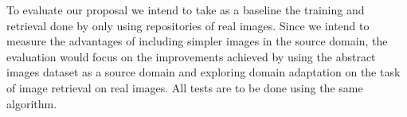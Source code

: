 \documentclass[11pt]{article}
\begin{document}
To evaluate our proposal we intend to take as a baseline the training and retrieval done by only using repositories of real images. Since we intend to measure the advantages of including simpler images in the source domain, the evaluation would focus on the improvements achieved by using the abstract images dataset as a source domain and exploring domain adaptation on the task of image retrieval on real images. All tests are to be done using the same algorithm. 



\nocite{*}


\end{document}
